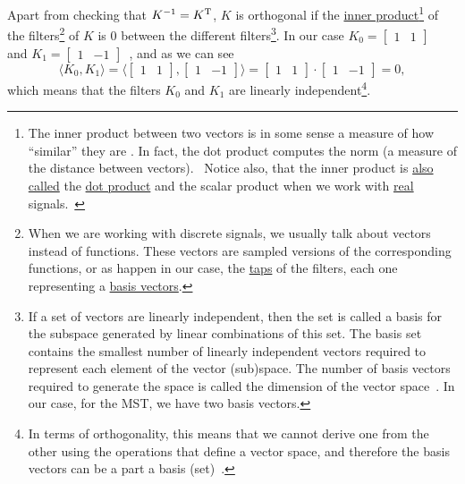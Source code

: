 Apart from checking that $K^{-1}=K^{\text T}$, $K$ is orthogonal if
the \href{https://en.wikipedia.org/wiki/Inner_product_space}{inner
  product}\footnote{The inner product between two vectors is in some
  sense a measure of how ``similar'' they are
  \cite{sayood2017introduction}. In fact, the dot product computes the
  norm (a measure of the distance between
  vectors).~\cite{vetterli2014foundations} Notice also, that the inner
  product is
  \href{https://math.stackexchange.com/questions/476738/difference-between-dot-product-and-inner-product}{also
    called} the \href{https://en.wikipedia.org/wiki/Dot_product}{dot
    product} and the scalar product when we work with
  \href{https://en.wikipedia.org/wiki/Real_number}{real}
  signals.~\cite{vetterli2014foundations}} of the
filters\footnote{When we are working with discrete signals, we usually
  talk about vectors instead of functions. These vectors are sampled
  versions of the corresponding functions, or as happen in our case,
  the
  \href{https://en.wikipedia.org/wiki/Finite_impulse_response}{taps}
  of the filters, each one representing a
  \href{https://en.wikipedia.org/wiki/Basis_(linear_algebra)}{basis
    vectors}.} of $K$ is $0$ between the different filters\footnote{If
  a set of vectors are linearly independent, then the set is called a
  basis for the subspace generated by linear combinations of this
  set. The basis set contains the smallest number of linearly
  independent vectors required to represent each element of the vector
  (sub)space. The number of basis vectors required to generate the
  space is called the dimension of the vector
  space~\cite{sayood2017introduction}. In our case, for the MST, we
  have two basis vectors.}. In our case
$K_0=\begin{bmatrix}1 & 1\end{bmatrix}$~ and
$K_1=\begin{bmatrix} 1 & -1\end{bmatrix}$~, and as we can see
\begin{equation}
  \langle K_0,K_1 \rangle =
  \langle \begin{bmatrix}
    1 & 1
  \end{bmatrix}
  ,
  \begin{bmatrix}
    1 & -1
  \end{bmatrix}
  \rangle =
  \begin{bmatrix}
    1 & 1
  \end{bmatrix}
  \cdot
  \begin{bmatrix}
    1 & -1
  \end{bmatrix}
   = 0,
\end{equation}
which means that the filters $K_0$ and $K_1$ are linearly
independent\footnote{In terms of orthogonality, this means that we
  cannot derive one from the other using the operations that define a
  vector space, and therefore the basis vectors can be a part a basis
  (set)~\cite{strang4linear}.}.


